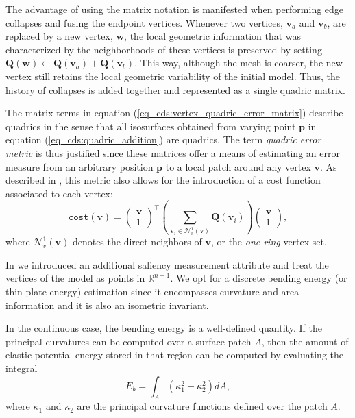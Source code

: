 \documentclass[graybox]{svmult}
\begin{document}
	The advantage of using the matrix notation is manifested when performing edge collapses and fusing the endpoint vertices. Whenever two vertices, $\mathbf{v}_a$ and $\mathbf{v}_b$, are replaced by a new vertex, $\mathbf{w}$, the local geometric information that was characterized by the neighborhoods of these vertices is preserved by setting $\mathbf{Q}(\mathbf{w}) \leftarrow \mathbf{Q}(\mathbf{v}_a) + \mathbf{Q}(\mathbf{v}_b)$. This way, although the mesh is coarser, the new vertex still retains the local geometric variability of the initial model. Thus, the history of collapses is added together and represented as a single quadric matrix. 
	
	The matrix terms in equation (\ref{eq_cds:vertex_quadric_error_matrix}) describe quadrics in the sense that all isosurfaces obtained from varying point $\mathbf{p}$ in equation (\ref{eq_cds:quadric_addition}) are quadrics. The term \emph{quadric error metric} is thus justified since these matrices offer a means of estimating an error measure from an arbitrary position $\mathbf{p}$ to a local patch around any vertex $\mathbf{v}$. As described in \cite{Cioaca2015}, this metric also allows for the introduction of a cost function associated to each vertex:
	\begin{equation}
	\mathtt{cost}(\mathbf{v}) = \begin{pmatrix} \mathbf{v} \\ 1 \end{pmatrix}^\intercal \left(\sum\limits_{\mathbf{v}_i \in \mathcal{N}_v^1(\mathbf{v})} { \mathbf{Q}(\mathbf{v}_i)}\right) \begin{pmatrix} \mathbf{v}\\ 1 \end{pmatrix},
	\label{eq_cds:vertex_cost}
	\end{equation}
	where $\mathcal{N}_v^1(\mathbf{v})$ denotes the direct neighbors of $\mathbf{v}$, or the \emph{one-ring} vertex set. 
	
	
	In \cite{Cioaca2015} we introduced an additional saliency measurement attribute and treat the vertices of the model as points in $\mathbb{R}^{n+1}$. We opt for a discrete bending energy (or thin plate energy)
	estimation since it encompasses curvature and area information and it is also an isometric invariant. 
	
	In the continuous case, the bending energy is a well-defined quantity. If the principal curvatures can be computed over a
	surface patch $A$, then the amount of elastic potential energy stored in that region can be computed by evaluating the integral
	\begin{equation}
	\label{eq_cds:bendingEnergy}
	E_{b} = \int_{A}{\left(\kappa_1^2 + \kappa_2^2\right)}dA,
	\end{equation}
	where $\kappa_1$ and $\kappa_2$ are the principal curvature functions defined over the patch $A$.
	
\end{document}
